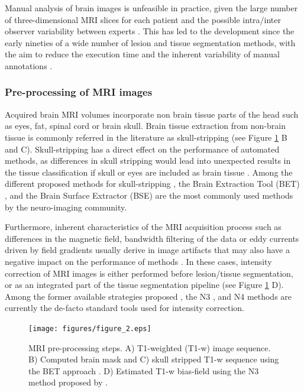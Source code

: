 Manual analysis of brain images is unfeasible in practice, given the large number of three-dimensional MRI slices for each patient and the possible intra/inter observer variability between experts \cite{Cabezas2011}. This has led to the development since the early nineties of a wide number of lesion and tissue segmentation methods, with the aim to reduce the execution time and the inherent variability of manual annotations \cite{Cline1990, Gerig1992, Kapur1996}. 


\subsubsection{Pre-processing of MRI images}
Acquired brain MRI volumes incorporate non brain tissue parts of the head such as eyes, fat, spinal cord or brain skull. Brain tissue extraction from non-brain tissue is commonly referred in the literature as skull-stripping (see Figure \ref{preprocessing_mri} B and C). Skull-stripping has a direct effect on the performance of automated methods, as differences in skull stripping would lead into unexpected results in the tissue classification if skull or eyes are included as brain tissue \cite{Acosta-Cabronero2008, Popescu2012}. Among the different proposed methods for skull-stripping \cite{Acosta-Cabronero2008, Lee2003, Roura2014}, the Brain Extraction Tool (BET) \cite{Smith2002}, and the Brain Surface Extractor (BSE) \cite{Shattuck2001} are the most commonly used methods by the neuro-imaging community.

Furthermore, inherent characteristics of the MRI acquisition process such as differences in the magnetic field, bandwidth filtering of the data or eddy currents driven by field gradients usually derive in image artifacts that may also have a negative impact on the performance of methods \cite{Simmons1994}. In these cases, intensity correction of MRI images is either performed before lesion/tissue segmentation, or as an integrated part of the tissue segmentation pipeline  (see Figure \ref{preprocessing_mri} D). Among the former available strategies proposed \cite{Arnold2001,Hou2006}, the N3 \cite{Sled1998}, and N4 \cite{Tustison2010} methods are currently the de-facto standard tools used for intensity correction. 


\begin{figure}[top]
  \begin{center}
    \texttt{[image: figures/figure\_2.eps]}
  \end{center}
    \caption{MRI pre-processing steps. A) T1-weighted (T1-w) image sequence. B) Computed brain mask and C) skull stripped T1-w sequence using the BET approach \cite{Smith2002}. D) Estimated T1-w bias-field using the N3 method proposed by \cite{Sled1998}.}
    \label{preprocessing_mri}
\end{figure}

